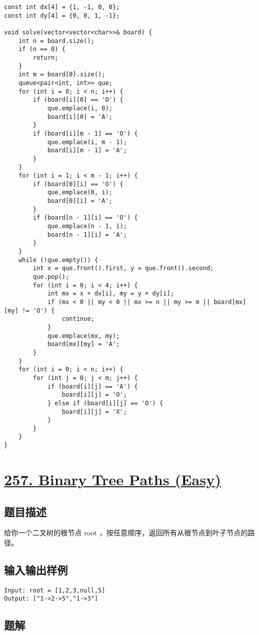 \documentclass[lang=cn,10pt]{elegantbook}
\begin{document}
\begin{lstlisting}
const int dx[4] = {1, -1, 0, 0};
const int dy[4] = {0, 0, 1, -1};

void solve(vector<vector<char>>& board) {
	int n = board.size();
	if (n == 0) {
		return;
	}
	int m = board[0].size();
	queue<pair<int, int>> que;
	for (int i = 0; i < n; i++) {
		if (board[i][0] == 'O') {
			que.emplace(i, 0);
			board[i][0] = 'A';
		}
		if (board[i][m - 1] == 'O') {
			que.emplace(i, m - 1);
			board[i][m - 1] = 'A';
		}
	}
	for (int i = 1; i < m - 1; i++) {
		if (board[0][i] == 'O') {
			que.emplace(0, i);
			board[0][i] = 'A';
		}
		if (board[n - 1][i] == 'O') {
			que.emplace(n - 1, i);
			board[n - 1][i] = 'A';
		}
	}
	while (!que.empty()) {
		int x = que.front().first, y = que.front().second;
		que.pop();
		for (int i = 0; i < 4; i++) {
			int mx = x + dx[i], my = y + dy[i];
			if (mx < 0 || my < 0 || mx >= n || my >= m || board[mx][my] != 'O') {
				continue;
			}
			que.emplace(mx, my);
			board[mx][my] = 'A';
		}
	}
	for (int i = 0; i < n; i++) {
		for (int j = 0; j < m; j++) {
			if (board[i][j] == 'A') {
				board[i][j] = 'O';
			} else if (board[i][j] == 'O') {
				board[i][j] = 'X';
			}
		}
	}
}
\end{lstlisting}

{\color{red}\section{\href{https://leetcode.cn/problems/binary-tree-paths/}{257. Binary Tree Paths (Easy)}}} \label{ch6.257}

\subsection*{题目描述}

给你一个二叉树的根节点 root ，按任意顺序，返回所有从根节点到叶子节点的路径。

\subsection*{输入输出样例}

\begin{lstlisting}
Input: root = [1,2,3,null,5]
Output: ["1->2->5","1->3"]
\end{lstlisting}

\subsection*{题解}
\end{document}

